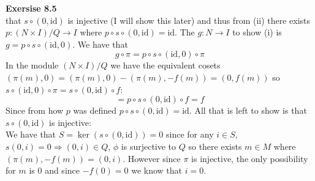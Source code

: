 \documentclass[12pt]{article}
\newenvironment{ques}[1]{\textbf{Exersise #1}\vspace{1 mm}\\ }{\bigskip}
\theoremstyle{definition}
\newcommand{\id}{\text{id}}
\begin{document}
\begin{ques}{8.5}
	that $s \circ (0,\id)$ is injective (I will show this later) and thus from
	(ii) there exists $p: (N \times I)/Q \to I$ where $p \circ s \circ (0,\id)
	= \id$. The $g: N \to I$ to show (i) is $g = p \circ s \circ (\id,0)$. We have that
	$$g \circ \pi  = p \circ s \circ (\id,0) \circ \pi$$
	In the module $(N \times I)/Q$ we have the equivalent cosets $(\pi(m),0) =
	(\pi(m),0) - (\pi(m), -f(m)) = (0,f(m))$ so $s \circ (\id,0) \circ \pi = s
	\circ
	(0,\id) \circ f$:
	$$ = p \circ s \circ (0,\id) \circ f = f$$
	Since from how $p$ was defined $p \circ s \circ (0,\id) = \id$. All
	that is left to show is that $s \circ (0, \id)$ is injective:\\
	We have that $S = \ker (s \circ (0,\id)) = 0$ since for any $i \in S$,
	$s(0,i) =0 \Rightarrow (0,i) \in Q$, $\phi$ is surjective to $Q$ so there
	exists $m \in M$ where
	$(\pi(m),-f(m)) = (0,i)$. However since $\pi$ is injective, the only
	possibility for $m$ is $0$ and since $-f(0) = 0$ we know that $i = 0$.

\end{ques}
\end{document}
